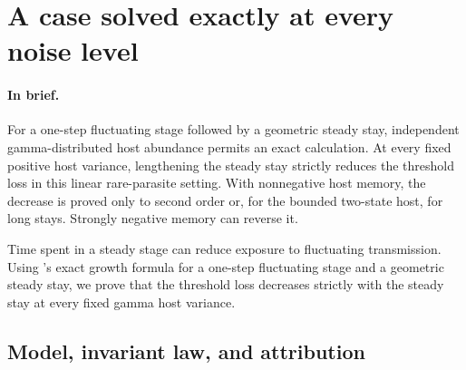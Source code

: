 \section{A case solved exactly at every noise level}\label{sec:exact}

\paragraph{In brief.}
For a one-step fluctuating stage followed by a geometric steady stay, independent gamma-distributed host abundance permits an exact calculation. At every fixed positive host variance, lengthening the steady stay strictly reduces the threshold loss in this linear rare-parasite setting. With nonnegative host memory, the decrease is proved only to second order or, for the bounded two-state host, for long stays. Strongly negative memory can reverse it.

Time spent in a steady stage can reduce exposure to fluctuating transmission. Using \citet{roerdink1988}'s exact growth formula for a one-step fluctuating stage and a geometric steady stay, we prove that the threshold loss decreases strictly with the steady stay at every fixed gamma host variance.

\subsection{Model, invariant law, and attribution}\label{subsec:exact-model}

